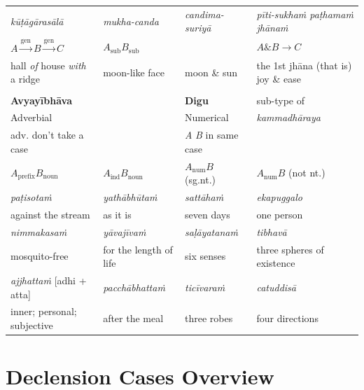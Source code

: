 \documentclass[a4paper]{memoir}
\begin{document}
\begin{minipage}{\linewidth+10pt}
\begin{longtable}{llll}
\hline
\emph{kūṭāgārasālā} & \emph{mukha-canda} & \emph{candima-suriyā} & \emph{pīti-sukhaṁ paṭhamaṁ jhānaṁ}\\[0pt]
\(A \xrightarrow{\text{gen}} B \xrightarrow{\text{gen}} C\) & \(A_{\text{sub}} B_{\text{sub}}\) &  & \(A \mathbin{\&} B \rightarrow C\)\\[0pt]
hall \emph{of} house \emph{with} a ridge & moon-like face & moon \& sun & the 1st jhāna (that is) joy \& ease\\[0pt]
 &  &  & \\[0pt]
\hline
\hline
\textbf{Avyayībhāva} &  & \textbf{Digu} & sub-type of\\[0pt]
Adverbial &  & Numerical & \emph{kammadhāraya}\\[0pt]
\hline
adv. don't take a case &  & \emph{A} \emph{B} in same case & \\[0pt]
\hline
\(A_{\text{prefix}} B_{\text{noun}}\) & \(A_{\text{ind}} B_{\text{noun}}\) & \(A_{\text{num}} B\) (sg.nt.) & \(A_{\text{num}} B\) (not nt.)\\[0pt]
\emph{paṭisotaṁ} & \emph{yathābhūtaṁ} & \emph{sattāhaṁ} & \emph{ekapuggalo}\\[0pt]
against the stream & as it is & seven days & one person\\[0pt]
\emph{nimmakasaṁ} & \emph{yāvajīvaṁ} & \emph{saḷāyatanaṁ} & \emph{tibhavā}\\[0pt]
mosquito-free & for the length of life & six senses & three spheres of existence\\[0pt]
\emph{ajjhattaṁ} [adhi + atta] & \emph{pacchābhattaṁ} & \emph{ticīvaraṁ} & \emph{catuddisā}\\[0pt]
inner; personal; subjective & after the meal & three robes & four directions\\[0pt]
\end{longtable}

\end{minipage}

\clearpage

\section{Declension Cases Overview}
\label{sec:org599f98f}

\casesLegendHeaderBGHere
\end{document}
